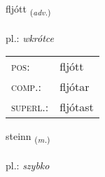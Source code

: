 \documentclass[frontgrid, backgrid]{flacards}\usepackage[]{graphicx}\usepackage[]{xcolor}
\begin{document}
\renewcommand{\flhead}{\vskip5pt \fboxsep=0pt {\small\bfseries\footnotesize Atviksorð | Adverb}}
\renewcommand{\fcfoot}{\vskip5pt \fboxsep=0pt \hspace{2pt}{\small\bfseries\footnotesize 2K}}

\renewcommand{\blhead}{\vskip5pt {\small\bfseries\footnotesize Atviksorð | Adverb }}
\renewcommand{\bcfoot}{\vskip5pt \hspace{2pt}{\small\bfseries\footnotesize 2K}}


{fljótt \small{\textsubscript{(\textit{adv.})}} \\[1ex] %
\textphonetic{[fljouht]} \\
pl.: \emph{wkrótce} \\  [2ex]
\renewcommand*{\arraystretch}{0.8}
\begin{tabular}{ll}
\textsc{pos}: & fljótt \\ 
\textsc{comp.}: & fljótar \\ 
\textsc{superl.}: & fljótast \\
\end{tabular}
}

\renewcommand{\flhead}{\vskip5pt \fboxsep=0pt {\small\bfseries\footnotesize Nafnorð | Noun}}
\renewcommand{\fcfoot}{\vskip5pt \fboxsep=0pt \hspace{2pt}{\small\bfseries\footnotesize 2K}}

\renewcommand{\blhead}{\vskip5pt {\small\bfseries\footnotesize Nafnorð | Noun }}
\renewcommand{\bcfoot}{\vskip5pt \hspace{2pt}{\small\bfseries\footnotesize 2K}}


{steinn \small{\textsubscript{(\textit{m.})}} \\[1ex] %
\textphonetic{[steitn̥]} \\
pl.: \emph{szybko} \\  [2ex]
\renewcommand*{\arraystretch}{0.8}
}
\end{document}

